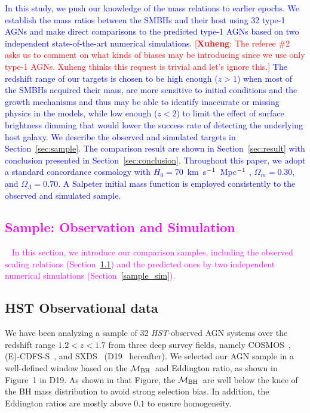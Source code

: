 \documentclass[twocolumn,trackchanges]{aastex63}
\newcommand{\hst}{{\it HST}}
\newcommand{\mbh}{$\mathcal M_{\rm BH}$}
\newcommand{\kmsMpc}{km~s$^{\rm -1}$~Mpc$^{\rm -1}$}
\newcommand{\ding}[1]{\textcolor{red}{[{\bf Xuheng}: #1]}}
\newcommand{\blue}[1]{{ \textcolor{blue}{#1}}}
\newcommand{\pink}[1]{{ \textcolor{magenta}{#1}}}
\begin{document}
\blue{
In this study, we push our knowledge of the mass relations to earlier epochs. We establish the mass ratios between the SMBHs and their host using 32 type-1 AGNs and make direct comparisons to the predicted type-1 AGNs based on two independent state-of-the-art numerical simulations.}
\ding{The referee \#2 asks us to comment on what kinds of biases may be introducing since we use only type-1 AGNs. Xuheng thinks this request is trivial and let's ignore this.}
\blue{The redshift range of our targets is chosen to be high enough ($z>1$) when most of the SMBHs acquired their mass, are more sensitive to initial
conditions and the growth mechanisms and thus may be able to identify inaccurate or missing physics in the models,  while low enough ($z<2$) to limit the effect of surface brightness dimming that would lower the success rate of detecting the underlying host galaxy. We describe the observed and simulated targets in Section~\ref{sec:sample}. The comparison result are shown in Section~\ref{sec:result} with conclusion presented in Section~\ref{sec:conclusion}. Throughout this paper, we adopt a standard concordance
cosmology with $H_0 = 70$~\kmsMpc
, $\Omega_m = 0.30$,
and $\Omega_\Lambda = 0.70$. A Salpeter initial mass function is employed consistently to the
observed and simulated sample.
}

\pink{
\section{Sample: Observation and Simulation}~\label{sec:sample}
In this section, we introduce our comparison samples, including the observed scaling relations (Section~\ref{hst_sample}) and the predicted ones by two independent numerical simulations (Section~\ref{sample_sim}).}
	
\subsection{HST Observational data}\label{hst_sample}
	
We have been analyzing a sample of 32 \hst-observed AGN systems over the redshift range $1.2<z<1.7$ from three deep survey fields, namely COSMOS~\citep{Civano2016}, (E)-CDFS-S~\citep{Lehmer2005, Xue2011}, and SXDS~\citep{Ueda2008} (D19~\citep{Ding2019} hereafter).
We selected our AGN sample in a well-defined window based on the \mbh\ and Eddington ratio, as shown in Figure~1 in D19. As shown in that Figure, the \mbh\ are well below the knee of the BH mass distribution to avoid strong selection bias. In addition, the Eddington ratios are mostly above $0.1$ to ensure homogeneity.
\end{document}
